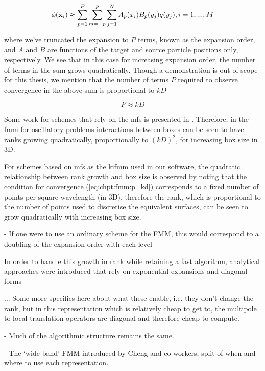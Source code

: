 \begin{equation}
    \phi(\mathbf{x}_i) \approx \sum_{p=1}^P \sum_{m=-p}^p \sum_{j=1}^N A_p(x_i) B_p(y_j) q(y_j), i=1,...,M
\end{equation}

where we've truncated the expansion to $P$ terms, known as the expansion order, and $A$ and $B$ are functions of the target and source particle positions only, respectively. We see that in this case for increasing expansion order, the number of terms in the sum grows quadratically. Though a demonstration is out of scope for this thesis, we mention that the number of terms $P$ required to observe convergence in the above sum is proportional to $kD$

\begin{equation}
    P \approx kD
    \label{eq:chpt:fmm:p_kd}
\end{equation}

Some work for schemes that rely on the \acrshort{mfs} is presented in \cite{barnett2008stability}. Therefore, in the \acrshort{fmm} for oscillatory problems interactions between boxes can be seen to have ranks growing quadratically, proportionally to $(kD)^2$, for increasing box size in 3D.

For schemes based on \acrshort{mfs} as the \acrshort{kifmm} used in our software, the quadratic relationship between rank growth and box size is observed by noting that the condition for convergence (\ref{eq:chpt:fmm:p_kd}) corresponds to a fixed number of points per square wavelength (in 3D), therefore the rank, which is proportional to the number of points used to discretise the equivalent surfaces, can be seen to grow quadratically with increasing box size.

- If one were to use an ordinary scheme for the FMM, this would correspond to a doubling of the expansion order with each level

In order to handle this growth in rank while retaining a fast algorithm, analytical approaches were introduced that rely on exponential expansions and diagonal forms

... Some more specifics here about what these enable, i.e. they don't change the rank, but in this representation which is relatively cheap to get to, the multipole to local translation operators are diagonal and therefore cheap to compute.

- Much of the algorithmic structure remains the same.

- The `wide-band' FMM introduced by Cheng and co-workers, split of when and where to use each representation.

